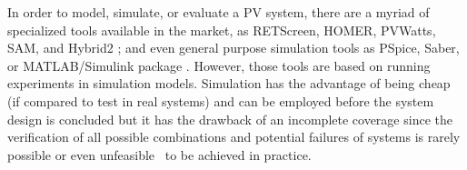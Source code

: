 \documentclass[journal]{IEEEtran}
\begin{document}
In order to model, simulate, or evaluate a PV system, there are a myriad of specialized tools available in the market, as RETScreen, HOMER, PVWatts, SAM, and Hybrid2 \cite{Pradhan,Swarnkar,NRELDobos,NRELBlair,Mills}; and even general purpose simulation tools as PSpice, Saber, or MATLAB/Simulink package \cite{Gow1999,Benatiallah2017}.
%
%
%
%
%
However, those tools are based on running experiments in simulation models. Simulation has the advantage of being cheap (if compared to test in real systems) and can be employed before the system design is concluded but it has the drawback of an incomplete coverage since the verification of all possible combinations and potential failures of systems is rarely possible or even unfeasible~\cite{ClarkeHV18} to be achieved in practice.
\end{document}
